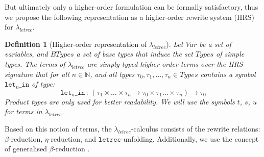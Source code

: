 \documentclass[submission,copyright,creativecommons]{eptcs}
\newtheorem{definition}[theorem]{Definition}
\newcommand{\lambdaletrec}{\ensuremath{\lambda_\textit{letrec}}}
\newcommand{\letrec}{\texttt{letrec}}
\newcommand{\allter}{t}
\newcommand{\bllter}{s}
\newcommand{\cllter}{u}
\newcommand{\slet}{\texttt{let}}
\newcommand{\sletini}[1]{\slet_{#1}\texttt{\_in}}
\newcommand{\atype}{\tau}
\newcommand{\Vars}{\mathit{Var}}
\newcommand{\BaseTypes}{\mathit{BTypes}}
\newcommand{\Types}{\mathit{Types}}
\newcommand{\nbd}{\nobreakdash}
\renewcommand\;{\,}
\newcommand{\nats}{\mathbb{N}}
\begin{document}
But ultimately only a higher-order formulation can be formally
satisfactory, thus we propose the following representation as a higher-order
rewrite system (HRS) \cite{terese:2003} for \lambdaletrec.

\begin{definition}[Higher-order representation of $\lambdaletrec$]\normalfont
  \label{def:lambdaletrec:terms}
Let $\Vars$ be a set of variables, and $\BaseTypes$ a set of base types that induce the set $\Types$ of simple types.
  The \emph{terms} of $\lambdaletrec$ are simply-typed higher-order terms over the HRS\nbd-signature
  that for all $n\in\nats$, and all types $\atype_0,\atype_1,\ldots,\atype_n\in\Types$ contains a symbol $\sletini{n}$ of type:
\begin{equation*}
\sletini{n} \,:\, 
            (\atype_1 \times \ldots \times \atype_n
              \to
             \atype_0 \times \atype_1 \ldots \times \atype_n)    
              \to
            \atype_0
\end{equation*}
Product types are only used for better readability.
We will use the symbols $\allter$, $\bllter$, $\cllter$ for terms in $\lambdaletrec$. 
\end{definition}  
  
Based on this notion of terms, the $\lambdaletrec$\nbd-calculus 
consists of the rewrite relations: $\beta$-reduction, $\eta$\nbd-reduction, and $\letrec$\nbd-unfolding.
Additionally, we use the concept of generalised $\beta$\nbd-reduction \cite{kama:nede:1995}.
\end{document}
